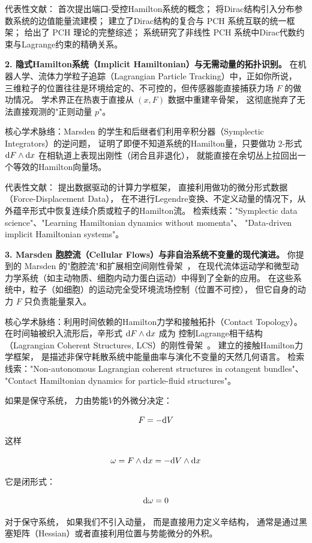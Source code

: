 ﻿\documentclass[10pt,a4paper]{article}
\numberwithin{equation}{section}
\begin{document}
\begin{framed}
代表性文献：\textcite{MaschkeVanDerSchaft1992} 首次提出端口-受控Hamilton系统的概念；
\textcite{VanDerSchaftMaschke2002} 将Dirac结构引入分布参数系统的边值能量流建模；
\textcite{CerveraVanDerSchaftBanos2007} 建立了Dirac结构的复合与 PCH 系统互联的统一框架；
\textcite{VanDerSchaftJeltsema2014} 给出了 PCH 理论的完整综述；
\textcite{VanDerSchaftMaschke2020} 系统研究了非线性 PCH 系统中Dirac代数约束与Lagrange约束的精确关系。

\textbf{2. 隐式Hamilton系统（Implicit Hamiltonian）与无需动量的拓扑识别。}
在机器人学、流体力学粒子追踪（Lagrangian Particle Tracking）中，正如你所说，
三维粒子的位置往往是环境给定的、不可控的，但传感器能直接捕获力场 $F$ 的做功情况。
学术界正在热衷于直接从 $(x, F)$ 数据中重建辛骨架，
这彻底抛弃了无法直接观测的"正则动量 $p$"。

核心学术脉络：Marsden 的学生和后继者们利用辛积分器（Symplectic Integrators）的逆问题，
证明了即便不知道系统的Hamilton量，只要做功 $2$-形式 $\text dF \wedge \text dx$ 在相轨道上表现出刚性（闭合且非退化），
就能直接在余切丛上拉回出一个等效的Hamilton向量场。

代表性文献：\textcite{KirchdoerferOrtiz2016} 提出数据驱动的计算力学框架，
直接利用做功的微分形式数据（Force-Displacement Data），
在不进行Legendre变换、不定义动量的情况下，从外蕴辛形式中恢复连续介质或粒子的Hamilton流。
检索线索："Symplectic data science"、"Learning Hamiltonian dynamics without momenta"、
"Data-driven implicit Hamiltonian systems"。

\textbf{3. Marsden 胞腔流（Cellular Flows）与非自治系统不变量的现代演进。}
你提到的 Marsden 的"胞腔流"和扩展相空间刚性骨架~\cite{MarsdenRatiu1994}，
在现代流体运动学和微型动力学系统（如主动物质、细胞内动力蛋白运动）中得到了全新的应用。
在这些系统中，粒子（如细胞）的运动完全受环境流场控制（位置不可控），
但它自身的动力 $F$ 只负责能量泵入。

核心学术脉络：利用时间依赖的Hamilton力学和接触拓扑（Contact Topology）。
在时间轴被织入流形后，辛形式 $\text dF \wedge \text dx$ 成为
控制Lagrange相干结构（Lagrangian Coherent Structures, LCS）的刚性骨架~\cite{Haller2015}。
\textcite{BravettiCruzTapias2017} 建立的接触Hamilton力学框架，
是描述非保守耗散系统中能量曲率与演化不变量的天然几何语言。
检索线索："Non-autonomous Lagrangian coherent structures in cotangent bundles"、
"Contact Hamiltonian dynamics for particle-fluid structures"。


\end{framed}



\begin{framed}
    
如果是保守系统，
力由势能$V$的外微分决定：

$$
F = - \text dV
$$

这样

$$
\omega = F \wedge \text dx = -\text dV \wedge \text dx
$$

它是闭形式：

$$
\text d\omega = 0
$$

对于保守系统，
如果我们不引入动量，
而是直接用力定义辛结构，
通常是通过黑塞矩阵（Hessian）或者直接利用位置与势能微分的外积。

\end{framed}
\end{document}
